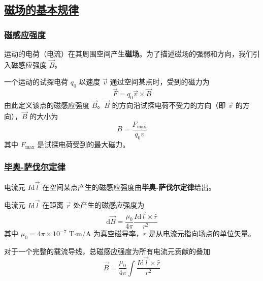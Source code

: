 \subsection{\protect\hyperlink{:}{磁场的基本规律}}

\subsubsection{\protect\hyperlink{:}{磁感应强度}}

运动的电荷（电流）在其周围空间产生\textbf{磁场}。为了描述磁场的强弱和方向，我们引入磁感应强度 $\vec{B}$。

\begin{definition}[磁感应强度]
    一个运动的试探电荷 $q_0$ 以速度 $\vec{v}$ 通过空间某点时，受到的磁力为
    \begin{equation}
        \vec{F} = q_0\vec{v} \times \vec{B}
    \end{equation}
    由此定义该点的磁感应强度 $\vec{B}$。$\vec{B}$ 的方向沿试探电荷不受力的方向（即 $\vec{v}$ 的方向），$\vec{B}$ 的大小为
    \begin{equation}
        B = \frac{F_{\max}}{q_0 v}
    \end{equation}
    其中 $F_{\max}$ 是试探电荷受到的最大磁力。
\end{definition}

\subsubsection{\protect\hyperlink{:}{毕奥-萨伐尔定律}}

电流元 $I\mathrm{d}\vec{l}$ 在空间某点产生的磁感应强度由\textbf{毕奥-萨伐尔定律}给出。

\begin{theorem}[毕奥-萨伐尔定律]
    电流元 $I\mathrm{d}\vec{l}$ 在距离 $\vec{r}$ 处产生的磁感应强度为
    \begin{equation}
        \mathrm{d}\vec{B} = \frac{\mu_0}{4\pi}\frac{I\mathrm{d}\vec{l} \times \hat{r}}{r^2}
    \end{equation}
    其中 $\mu_0 = 4\pi \times 10^{-7}$ T$\cdot$m/A 为真空磁导率，$\hat{r}$ 是从电流元指向场点的单位矢量。
\end{theorem}

对于一个完整的载流导线，总磁感应强度为所有电流元贡献的叠加
\begin{equation}
    \vec{B} = \frac{\mu_0}{4\pi}\int \frac{I\mathrm{d}\vec{l} \times \hat{r}}{r^2}
\end{equation}

